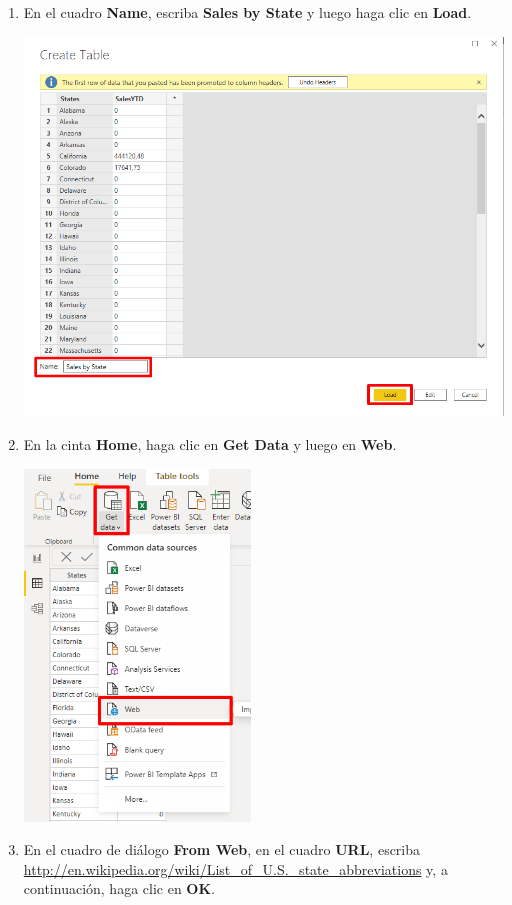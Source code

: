 \documentclass[12pt,letterpaper]{article}
\newcommand\tab[1][1cm]{\hspace*{#1}}
\begin{document}
\begin{enumerate}[\tab 1.]
\begin{center}
        \end{center}
        \item En el cuadro \textbf{Name}, escriba \textbf{Sales by State} y luego haga clic en \textbf{Load}.
        \begin{center}
            \includegraphics[width=13cm]{./img/img52.png}
        \end{center}
        \item En la cinta \textbf{Home}, haga clic en \textbf{Get Data} y luego en \textbf{Web}.
        \begin{center}
            \includegraphics[width=6cm]{./img/img53.png}
        \end{center}
        \item En el cuadro de diálogo \textbf{From Web}, en el cuadro \textbf{URL}, escriba \url{http://en.wikipedia.org/wiki/List_of_U.S._state_abbreviations} y, a continuación, haga clic en \textbf{OK}.

\end{enumerate}
\end{document}
